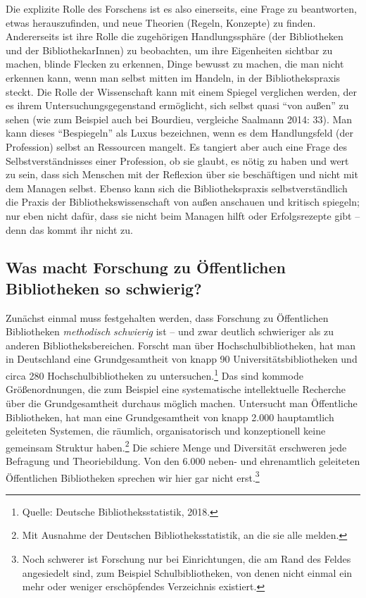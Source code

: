 \documentclass[a4paper,
fontsize=11pt,
oneside,
numbers=noperiodatend,
parskip=half-,
bibliography=totoc,
final
]{scrartcl}
\begin{document}
Die explizite Rolle des Forschens ist es also einerseits, eine Frage zu
beantworten, etwas herauszufinden, und neue Theorien (Regeln, Konzepte)
zu finden. Andererseits ist ihre Rolle die zugehörigen Handlungssphäre
(der Bibliotheken und der BibliothekarInnen) zu beobachten, um ihre
Eigenheiten sichtbar zu machen, blinde Flecken zu erkennen, Dinge
bewusst zu machen, die man nicht erkennen kann, wenn man selbst mitten
im Handeln, in der Bibliothekspraxis steckt. Die Rolle der Wissenschaft
kann mit einem Spiegel verglichen werden, der es ihrem
Untersuchungsgegenstand ermöglicht, sich selbst quasi \enquote{von
außen} zu sehen (wie zum Beispiel auch bei Bourdieu, vergleiche Saalmann
2014: 33). Man kann dieses \enquote{Bespiegeln} als Luxus bezeichnen,
wenn es dem Handlungsfeld (der Profession) selbst an Ressourcen mangelt.
Es tangiert aber auch eine Frage des Selbstverständnisses einer
Profession, ob sie glaubt, es nötig zu haben und wert zu sein, dass sich
Menschen mit der Reflexion über sie beschäftigen und nicht mit dem
Managen selbst. Ebenso kann sich die Bibliothekspraxis
selbstverständlich die Praxis der Bibliothekswissenschaft von außen
anschauen und kritisch spiegeln; nur eben nicht dafür, dass sie nicht
beim Managen hilft oder Erfolgsrezepte gibt -- denn das kommt ihr nicht
zu.

\hypertarget{was-macht-forschung-zu-uxf6ffentlichen-bibliotheken-so-schwierig}{%
\subsection{Was macht Forschung zu Öffentlichen Bibliotheken so
schwierig?}\label{was-macht-forschung-zu-uxf6ffentlichen-bibliotheken-so-schwierig}}

Zunächst einmal muss festgehalten werden, dass Forschung zu Öffentlichen
Bibliotheken \emph{methodisch} \emph{schwierig} ist -- und zwar deutlich
schwieriger als zu anderen Bibliotheksbereichen. Forscht man über
Hochschulbibliotheken, hat man in Deutschland eine Grundgesamtheit von
knapp 90 Universitätsbibliotheken und circa 280 Hochschulbibliotheken zu
untersuchen.\footnote{Quelle: Deutsche Bibliotheksstatistik, 2018.} Das
sind kommode Größenordnungen, die zum Beispiel eine systematische
intellektuelle Recherche über die Grundgesamtheit durchaus möglich
machen. Untersucht man Öffentliche Bibliotheken, hat man eine
Grundgesamtheit von knapp 2.000 hauptamtlich geleiteten Systemen, die
räumlich, organisatorisch und konzeptionell keine gemeinsam Struktur
haben.\footnote{Mit Ausnahme der Deutschen Bibliotheksstatistik, an die
  sie alle melden.} Die schiere Menge und Diversität erschweren jede
Befragung und Theoriebildung. Von den 6.000 neben- und ehrenamtlich
geleiteten Öffentlichen Bibliotheken sprechen wir hier gar nicht
erst.\footnote{Noch schwerer ist Forschung nur bei Einrichtungen, die am
  Rand des Feldes angesiedelt sind, zum Beispiel Schulbibliotheken, von
  denen nicht einmal ein mehr oder weniger erschöpfendes Verzeichnis
  existiert.}
\end{document}
